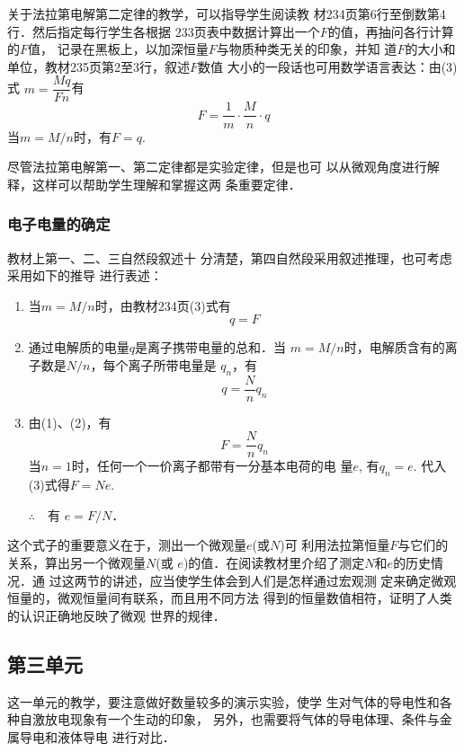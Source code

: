 关于法拉第电解第二定律的教学，可以指导学生阅读教
材234页第6行至倒数第4行．然后指定每行学生各根据
233页表中数据计算出一个$F$的值，再抽问各行计算的$F$值，
记录在黑板上，以加深恒量$F$与物质种类无关的印象，并知
道$F$的大小和单位，教材235页第2至3行，叙述$F$数值
大小的一段话也可用数学语言表达：由(3)式
$m=\dfrac{Mq}{Fn}$有
\[F=\frac{1}{m}\cdot \frac{M}{n}\cdot q\]
当$m=M/n$时，有$F=q$.

尽管法拉第电解第一、第二定律都是实验定律，但是也可
以从微观角度进行解释，这样可以帮助学生理解和掌握这两
条重要定律．

\subsubsection{电子电量的确定}

教材上第一、二、三自然段叙述十
分清楚，第四自然段采用叙述推理，也可考虑采用如下的推导
进行表述：
\begin{enumerate}
    \item 当$m=M/n$时，由教材234页(3)式有
    \begin{equation}
        q=F
    \end{equation}

\item 通过电解质的电量$q$是离子携带电量的总和．当
$m=M/n$时，电解质含有的离子数是$N/n$，每个离子所带电量是
$q_n$，有
\begin{equation}
    q=\frac{N}{n}q_n
\end{equation}
\item 由(1)、(2)，有
\begin{equation}
    F=\frac{N}{n}q_n
\end{equation}
当$n=1$时，任何一个一价离子都带有一分基本电荷的电
量$e$, 有$q_n=e$. 代入(3)式得$F=Ne$.

$\therefore\quad $有 $e=F/N$．
\end{enumerate}

这个式子的重要意义在于，测出一个微观量$e$(或$N$)可
利用法拉第恒量$F$与它们的关系，算出另一个微观量$N$(或
$e$)的值．在阅读教材里介绍了测定$N$和$e$的历史情况．通
过这两节的讲述，应当使学生体会到人们是怎样通过宏观测
定来确定微观恒量的，微观恒量间有联系，而且用不同方法
得到的恒量数值相符，证明了人类的认识正确地反映了微观
世界的规律．

\subsection{第三单元}
这一单元的教学，要注意做好数量较多的演示实验，使学
生对气体的导电性和各种自激放电现象有一个生动的印象，
另外，也需要将气体的导电体理、条件与金属导电和液体导电
进行对比．

